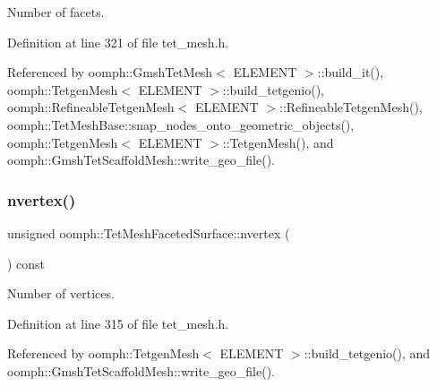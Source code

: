 Number of facets. 



Definition at line 321 of file tet\+\_\+mesh.\+h.



Referenced by oomph\+::\+Gmsh\+Tet\+Mesh$<$ E\+L\+E\+M\+E\+N\+T $>$\+::build\+\_\+it(), oomph\+::\+Tetgen\+Mesh$<$ E\+L\+E\+M\+E\+N\+T $>$\+::build\+\_\+tetgenio(), oomph\+::\+Refineable\+Tetgen\+Mesh$<$ E\+L\+E\+M\+E\+N\+T $>$\+::\+Refineable\+Tetgen\+Mesh(), oomph\+::\+Tet\+Mesh\+Base\+::snap\+\_\+nodes\+\_\+onto\+\_\+geometric\+\_\+objects(), oomph\+::\+Tetgen\+Mesh$<$ E\+L\+E\+M\+E\+N\+T $>$\+::\+Tetgen\+Mesh(), and oomph\+::\+Gmsh\+Tet\+Scaffold\+Mesh\+::write\+\_\+geo\+\_\+file().

\mbox{\label{classoomph_1_1TetMeshFacetedSurface_aae77dfb3a856e3840564e21716f4c3b1}} 
\subsubsection{\texorpdfstring{nvertex()}{nvertex()}}
{\footnotesize\ttfamily unsigned oomph\+::\+Tet\+Mesh\+Faceted\+Surface\+::nvertex (\begin{DoxyParamCaption}{ }\end{DoxyParamCaption}) const\hspace{0.3cm}{\ttfamily [inline]}}



Number of vertices. 



Definition at line 315 of file tet\+\_\+mesh.\+h.



Referenced by oomph\+::\+Tetgen\+Mesh$<$ E\+L\+E\+M\+E\+N\+T $>$\+::build\+\_\+tetgenio(), and oomph\+::\+Gmsh\+Tet\+Scaffold\+Mesh\+::write\+\_\+geo\+\_\+file().

\mbox{\label{classoomph_1_1TetMeshFacetedSurface_a03f007362dac8406ad9b7337f1887c9d}} 
